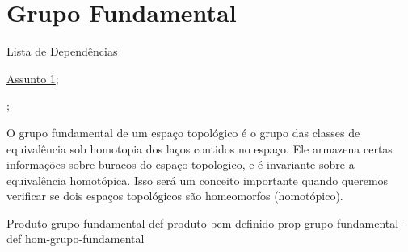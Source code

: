 
\maketitle
\section{Grupo Fundamental}
\label{grupo-fundamental}

\begin{titlemize}{Lista de Dependências}
	\item \hyperref[assunto1]{Assunto 1};\\ %
	\item \hyperref[]{};
\end{titlemize}

O grupo fundamental de um espaço topológico é o grupo das classes de equivalência sob homotopia dos laços contidos no espaço. Ele armazena certas informações sobre buracos do espaço topologico, e é invariante sobre a equivalência homotópica. Isso será um conceito importante quando queremos verificar se dois espaços topológicos são homeomorfos (homotópico).

{Produto-grupo-fundamental-def}%
{produto-bem-definido-prop}
{grupo-fundamental-def}
{hom-grupo-fundamental}


